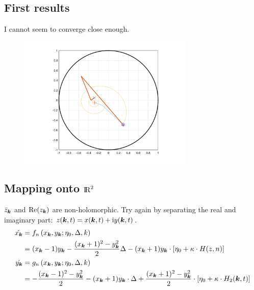 \subsection{First results}
I cannot seem to converge close enough.
\begin{figure}[H]
\centering
\includegraphics[width = 0.75\textwidth]{../Figures/ProblemsWithNewtonRaphson.png}
\end{figure}


\subsection{Mapping onto ${\rm I\!R}^2$}
$\bar{z}_{{\boldsymbol{k}}}$ and ${\operatorname{Re}}(z_{{\boldsymbol{k}}})$ are non-holomorphic. Try again by separating the real and imaginary part: $z({\boldsymbol{k}},t) = x({\boldsymbol{k}},t) + {\rm{i}} y({\boldsymbol{k}},t)$.
\begin{align*}
\begin{aligned} \dot{x_{{\boldsymbol{k}}}} 
&=f_{n}\left(x_{{\boldsymbol{k}}}, y_{{\boldsymbol{k}}} ; \eta_{0}, \Delta, k\right) \\ 
&=(x_{{\boldsymbol{k}}}-1) y_{{\boldsymbol{k}}}-\frac{(x_{{\boldsymbol{k}}}+1)^{2}-y_{{\boldsymbol{k}}}^{2}}{2} \Delta-(x_{{\boldsymbol{k}}}+1) y_{{\boldsymbol{k}}} \cdot \left[\eta_{0}+ \kappa \cdot H(z, n)\right] \\ \dot{y_{{\boldsymbol{k}}}} &=g_{n}\left(x_{{\boldsymbol{k}}}, y_{{\boldsymbol{k}}} ; \eta_{0}, \Delta, k\right) \\ 
&=-\frac{(x_{{\boldsymbol{k}}}-1)^{2}-y_{{\boldsymbol{k}}}^{2}}{2}-(x_{{\boldsymbol{k}}}+1) y_{{\boldsymbol{k}}} \cdot \Delta+\frac{(x_{{\boldsymbol{k}}}+1)^{2}-y_{{\boldsymbol{k}}}^{2}}{2} \cdot \left[\eta_{0} + \kappa \cdot H_2({\boldsymbol{k}}, t)\right] \end{aligned}
\end{align*}


